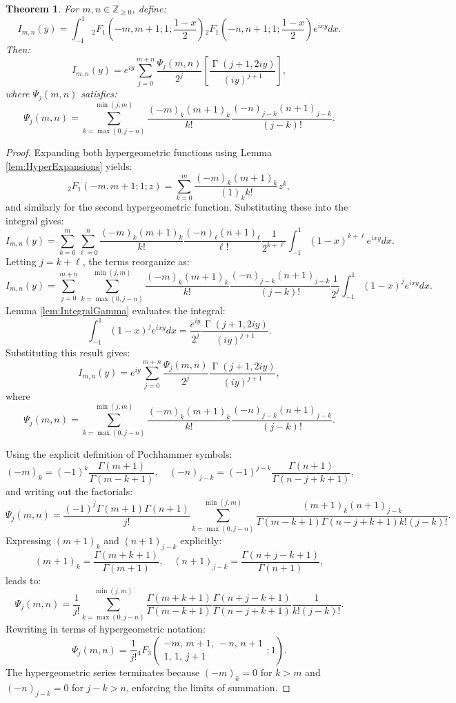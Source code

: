 \documentclass[12pt]{article}
\newtheorem{theorem}{Theorem}
\DeclareMathOperator{\gamma}{\Gamma}
\begin{document}
\begin{theorem}\label{thm:EvaluationOfIntegral}
For $m, n \in \mathbb{Z}_{\geq 0}$, define:
\[
I_{m,n}(y) = \int_{-1}^1 {}_2F_1\left(-m, m+1; 1; \frac{1-x}{2}\right) {}_2F_1\left(-n, n+1; 1; \frac{1-x}{2}\right) e^{i x y} dx.
\]
Then:
\[
I_{m,n}(y) = e^{iy}\sum_{j=0}^{m+n}\frac{\Psi_j(m,n)}{2^j}\left[\frac{\gamma(j+1,2iy)}{(iy)^{j+1}}\right],
\]
where $\Psi_j(m,n)$ satisfies:
\begin{equation}\label{eq:PsiEquality}
\Psi_j(m,n) = \sum_{k=\max(0,j-n)}^{\min(j,m)}\frac{(-m)_k(m+1)_k}{k!}\frac{(-n)_{j-k}(n+1)_{j-k}}{(j-k)!}.
\end{equation}
\end{theorem}

\begin{proof}
Expanding both hypergeometric functions using Lemma \ref{lem:HyperExpansions} yields:
\[
{}_2F_1(-m, m+1; 1; z) = \sum_{k=0}^m \frac{(-m)_k (m+1)_k}{(1)_k k!} z^k,
\]
and similarly for the second hypergeometric function. Substituting these into the integral gives:
\[
I_{m,n}(y) = \sum_{k=0}^m \sum_{\ell=0}^n \frac{(-m)_k (m+1)_k}{k!} \frac{(-n)_\ell (n+1)_\ell}{\ell!} \frac{1}{2^{k+\ell}} \int_{-1}^1 (1-x)^{k+\ell} e^{i x y} dx.
\]
Letting $j = k + \ell$, the terms reorganize as:
\[
I_{m,n}(y) = \sum_{j=0}^{m+n} \sum_{k=\max(0,j-n)}^{\min(j,m)} \frac{(-m)_k(m+1)_k}{k!} \frac{(-n)_{j-k}(n+1)_{j-k}}{(j-k)!} \frac{1}{2^j} \int_{-1}^1 (1-x)^j e^{i x y} dx.
\]
Lemma \ref{lem:IntegralGamma} evaluates the integral:
\[
\int_{-1}^1 (1-x)^j e^{ixy} dx = \frac{e^{iy}}{2^j} \frac{\gamma(j+1, 2iy)}{(iy)^{j+1}}.
\]
Substituting this result gives:
\[
I_{m,n}(y) = e^{iy} \sum_{j=0}^{m+n} \frac{\Psi_j(m, n)}{2^j} \frac{\gamma(j+1, 2iy)}{(iy)^{j+1}},
\]
where
\[
\Psi_j(m, n) = \sum_{k=\max(0, j-n)}^{\min(j, m)} \frac{(-m)_k(m+1)_k}{k!} \frac{(-n)_{j-k}(n+1)_{j-k}}{(j-k)!}.
\]

Using the explicit definition of Pochhammer symbols:
\[
(-m)_k = (-1)^k \frac{\Gamma(m+1)}{\Gamma(m-k+1)}, \quad (-n)_{j-k} = (-1)^{j-k} \frac{\Gamma(n+1)}{\Gamma(n-j+k+1)},
\]
and writing out the factorials:
\[
\Psi_j(m,n) = \frac{(-1)^j \Gamma(m+1) \Gamma(n+1)}{j!} \sum_{k=\max(0,j-n)}^{\min(j,m)} \frac{(m+1)_k (n+1)_{j-k}}{\Gamma(m-k+1)\Gamma(n-j+k+1)k!(j-k)!}.
\]
Expressing $(m+1)_k$ and $(n+1)_{j-k}$ explicitly:
\[
(m+1)_k = \frac{\Gamma(m+k+1)}{\Gamma(m+1)}, \quad (n+1)_{j-k} = \frac{\Gamma(n+j-k+1)}{\Gamma(n+1)},
\]
leads to:
\[
\Psi_j(m, n) = \frac{1}{j!} \sum_{k=\max(0,j-n)}^{\min(j,m)} \frac{\Gamma(m+k+1)}{\Gamma(m-k+1)} \frac{\Gamma(n+j-k+1)}{\Gamma(n-j+k+1)} \frac{1}{k! (j-k)!}.
\]
Rewriting in terms of hypergeometric notation:
\[
\Psi_j(m, n) = \frac{1}{j!} {}_4F_3\left(\begin{smallmatrix}-m,\, m+1,\, -n,\, n+1 \\ 1,\, 1,\, j+1\end{smallmatrix}; 1\right).
\]
The hypergeometric series terminates because $(-m)_k = 0$ for $k > m$ and $(-n)_{j-k} = 0$ for $j-k > n$, enforcing the limits of summation.
\end{proof}
\end{document}
